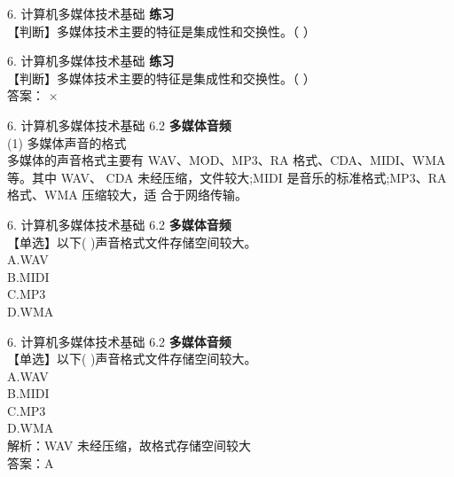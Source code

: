 \documentclass[aspectratio=169]{beamer}
\begin{document}
\begin{frame}[t]{6. 计算机多媒体技术基础} \vspace{20pt}
    \textbf{练习}\\
    【判断】多媒体技术主要的特征是集成性和交换性。（ ）\\
\end{frame}
\begin{frame}[t]{6. 计算机多媒体技术基础} \vspace{20pt}
    \textbf{练习}\\
    【判断】多媒体技术主要的特征是集成性和交换性。（ ）\\
答案： ×
\end{frame}



\begin{frame}[t]{6. 计算机多媒体技术基础} \vspace{20pt}
    6.2 \textbf{多媒体音频}\\
    (1) 多媒体声音的格式\\
    多媒体的声音格式主要有 WAV、MOD、MP3、RA 格式、CDA、MIDI、WMA 等。其中 WAV、
CDA 未经压缩，文件较大;MIDI 是音乐的标准格式;MP3、RA 格式、WMA 压缩较大，适
合于网络传输。\\
\end{frame}

\begin{frame}[t]{6. 计算机多媒体技术基础} \vspace{20pt}
    6.2 \textbf{多媒体音频}\\
    【单选】以下( )声音格式文件存储空间较大。\\
A.WAV \\B.MIDI\\
C.MP3\\ D.WMA\\
\end{frame}


\begin{frame}[t]{6. 计算机多媒体技术基础} \vspace{20pt}
    6.2 \textbf{多媒体音频}\\
    【单选】以下( )声音格式文件存储空间较大。\\
    A.WAV \\B.MIDI\\
    C.MP3\\ D.WMA\\
    解析：WAV 未经压缩，故格式存储空间较大\\
    答案：A\\
\end{frame}
\end{document}
